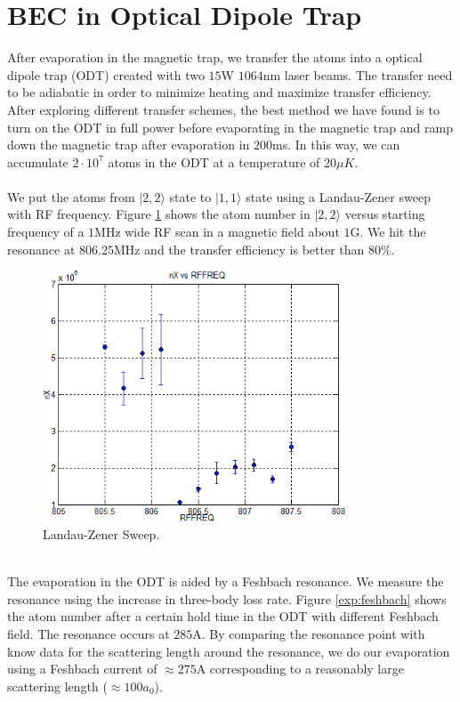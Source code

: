 \section{BEC in Optical Dipole Trap}\label{exp:odt}

After evaporation in the magnetic trap, we transfer the atoms into a optical dipole trap (ODT) created with two $15$W $1064$nm laser beams. The transfer need to be adiabatic in order to minimize heating and maximize transfer efficiency. After exploring different transfer schemes, the best method we have found is to turn on the ODT in full power before evaporating in the magnetic trap and ramp down the magnetic trap after evaporation in $200$ms. In this way, we can accumulate $2\cdot10^7$ atoms in the ODT at a temperature of $20\mu K$.\\
\\
We put the atoms from $|2, 2\rangle$ state to $|1, 1\rangle$ state using a Landau-Zener sweep with RF frequency. Figure \ref{exp:landao-zener} shows the atom number in $|2, 2\rangle$ versus starting frequency of a $1$MHz wide RF scan in a magnetic field about $1$G. We hit the resonance at $806.25$MHz and the transfer efficiency is better than $80\%$.\\
\begin{figure}
  \begin{center}
    \includegraphics[width=9cm]{landao-zener.png}
  \end{center}
  \caption{Landau-Zener Sweep.}
  \label{exp:landao-zener}
\end{figure}\\
The evaporation in the ODT is aided by a Feshbach resonance. We measure the resonance using the increase in three-body loss rate. Figure \ref{exp:feshbach} shows the atom number after a certain hold time in the ODT with different Feshbach field. The resonance occurs at $285$A. By comparing the resonance point with know data for the scattering length around the resonance, we do our evaporation using a Feshbach current of $\approx275$A corresponding to a reasonably large scattering length ($\approx100a_0$).

